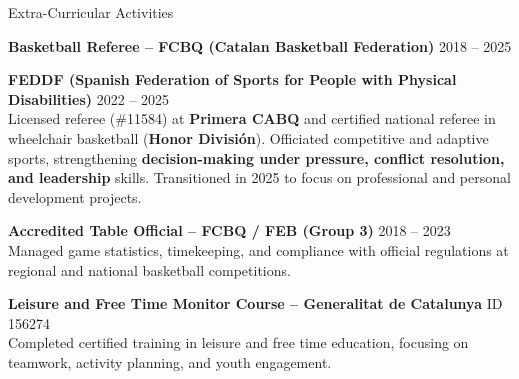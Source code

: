 \documentclass{resume} %
\newcommand\spaceBetween{-0.3}
\begin{document}
\vspace{\spaceBetween em}
\begin{rSection}{Extra-Curricular Activities}
\vspace{-1.0 em}
\item \textbf{Basketball Referee – FCBQ (Catalan Basketball Federation)} \hfill 2018 – 2025 \\
\vspace{-1.5 em}
\item \textbf{FEDDF (Spanish Federation of Sports for People with Physical Disabilities)} \hfill 2022 – 2025 \\
Licensed referee (\#11584) at \textbf{Primera CABQ} and certified national referee in wheelchair basketball (\textbf{Honor División}). Officiated competitive and adaptive sports, strengthening \textbf{decision-making under pressure, conflict resolution, and leadership} skills. Transitioned in 2025 to focus on professional and personal development projects.
\item \textbf{Accredited Table Official – FCBQ / FEB (Group 3)} \hfill 2018 – 2023 \\
Managed game statistics, timekeeping, and compliance with official regulations at regional and national basketball competitions.
\item \textbf{Leisure and Free Time Monitor Course – Generalitat de Catalunya} \hfill ID 156274 \\
Completed certified training in leisure and free time education, focusing on teamwork, activity planning, and youth engagement.
\end{rSection}
\end{document}
